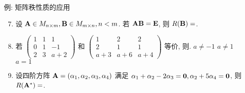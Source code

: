 \begin{frame}{例: 矩阵秩性质的应用}
	\onslide<+->
	\begin{exercise}
		\begin{enumerate}
			\setcounter{enumi}{6}
			\item 设 ${\mathbf{A}}\in M_{n\times m},{\mathbf{B}}\in M_{m\times n},n<m$. 若 ${\mathbf{A}}{\mathbf{B}}={\mathbf{E}}$, 则 $R({\mathbf{B}})=$.
			\item 若 $\begin{pmatrix}
				1&1&1\\0&1&-1\\2&3&a+2
			\end{pmatrix}$ 和 $\begin{pmatrix}
				1&2&2\\2&1&1\\a+3&a+6&a+4
			\end{pmatrix}$ 等价, 则.
			{$a\neq-1$}%
			{$a\neq 1$}%
			{$a=1$}
			\item 设四阶方阵 ${\mathbf{A}}=(\alpha_1,\alpha_2,\alpha_3,\alpha_4)$ 满足 $\alpha_1+\alpha_2-2\alpha_3={\bf0},\alpha_2+5\alpha_4={\bf0}$, 则 $R({\mathbf{A}}^*)=$.
		\end{enumerate}
	\end{exercise}
\end{frame}
